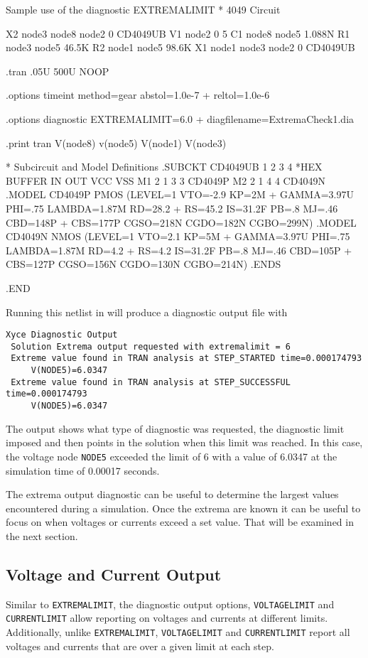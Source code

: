 \begin{NetlistFigure}{Sample use of the diagnostic EXTREMALIMIT}
* 4049 Circuit

X2 node3 node8 node2 0 CD4049UB
V1 node2 0 5
C1 node8 node5 1.088N
R1 node3 node5 46.5K
R2 node1 node5 98.6K
X1 node1 node3 node2 0 CD4049UB

.tran .05U 500U NOOP

.options timeint method=gear abstol=1.0e-7 
+ reltol=1.0e-6

.options diagnostic EXTREMALIMIT=6.0 
+ diagfilename=ExtremaCheck1.dia

.print tran V(node8) v(node5) V(node1) V(node3)

* Subcircuit and Model Definitions
.SUBCKT CD4049UB 1  2   3   4
*HEX BUFFER    IN OUT VCC VSS
M1 2 1 3 3 CD4049P
M2 2 1 4 4 CD4049N
.MODEL CD4049P PMOS (LEVEL=1 VTO=-2.9 KP=2M 
+ GAMMA=3.97U PHI=.75 LAMBDA=1.87M RD=28.2 
+ RS=45.2 IS=31.2F PB=.8 MJ=.46 CBD=148P 
+ CBS=177P CGSO=218N CGDO=182N CGBO=299N)
.MODEL CD4049N NMOS (LEVEL=1 VTO=2.1 KP=5M 
+ GAMMA=3.97U PHI=.75 LAMBDA=1.87M RD=4.2 
+ RS=4.2 IS=31.2F PB=.8 MJ=.46 CBD=105P 
+ CBS=127P CGSO=156N CGDO=130N CGBO=214N)
.ENDS

.END
\end{NetlistFigure}

Running this netlist in \Xyce{} will produce a diagnostic output file with 
\begin{verbatim}
Xyce Diagnostic Output
 Solution Extrema output requested with extremalimit = 6
 Extreme value found in TRAN analysis at STEP_STARTED time=0.000174793
     V(NODE5)=6.0347
 Extreme value found in TRAN analysis at STEP_SUCCESSFUL time=0.000174793
     V(NODE5)=6.0347
\end{verbatim}

The output shows what type of diagnostic was requested, the diagnostic limit imposed
and then points in the solution when this limit was reached.  In this case, the 
voltage node \texttt{NODE5} exceeded the limit of 6 with a value of 6.0347 at the 
simulation time of 0.00017 seconds.

The extrema output diagnostic can be useful to determine the largest values encountered
during a simulation.  Once the extrema are known it can be useful to focus on when 
voltages or currents exceed a set value.  That will be examined in the next section.

\subsection{Voltage and Current Output}
Similar to \texttt{EXTREMALIMIT}, the diagnostic output options, \texttt{VOLTAGELIMIT} and
\texttt{CURRENTLIMIT} allow reporting on voltages and currents at different limits.  Additionally,
unlike \texttt{EXTREMALIMIT}, \texttt{VOLTAGELIMIT} and \texttt{CURRENTLIMIT} report all 
voltages and currents that are over a given limit at each step.

